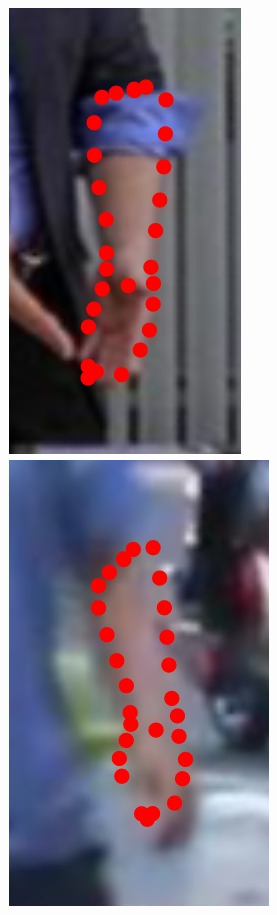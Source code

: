 \begin{figure}
    \includegraphics[height=\ofh]{resources/Annotation_Correction/Suplementory_Meterial/ExFit/0009}
    \hfill
    \includegraphics[height=\ofh]{resources/Annotation_Correction/Suplementory_Meterial/ExFit/0010}
    \hfill

\end{figure}
